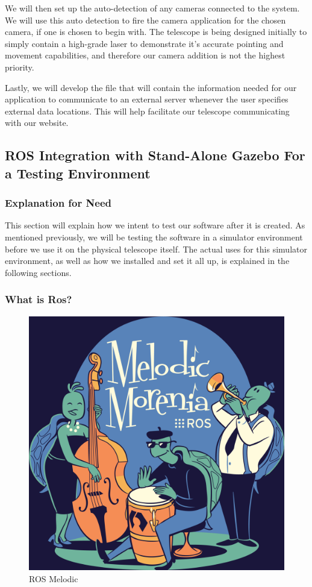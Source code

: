 \documentclass[12pt]{report}
\begin{document}
We will then set up the auto-detection of any cameras connected to the system. We will use this auto detection to fire the camera application for the chosen camera, if one is chosen to begin with. The telescope is being designed initially to simply contain a high-grade laser to demonstrate it's accurate pointing and movement capabilities, and therefore our camera addition is not the highest priority.

Lastly, we will develop the file that will contain the information needed for our application to communicate to an external server whenever the user specifies external data locations. This will help facilitate our telescope communicating with our website.

\subsection*{ROS Integration with Stand-Alone Gazebo For a Testing Environment}

\subsubsection*{Explanation for Need}

This section will explain how we intent to test our software after it is created. As mentioned previously, we will be testing the software in a simulator environment before we use it on the physical telescope itself. The actual uses for this simulator environment, as well as how we installed and set it all up, is explained in the following sections.

\newpage

\subsubsection*{What is Ros?}

\begin{figure}[h]
	\centering
	\includegraphics[width=0.50\linewidth]{melodic}
	\caption{ROS Melodic}
\end{figure}
\end{document}
